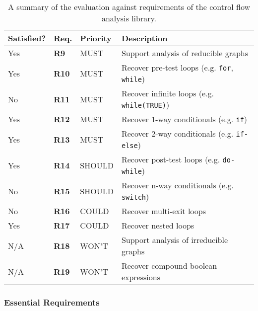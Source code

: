 \begin{table}[htbp]
	\begin{center}
		\begin{tabular}{|l|l|l|l|}
			\hline
			Satisfied? & Req. & Priority & Description \\
			\hline
			\rowcolor{light_green_3}
			Yes & \textbf{R9} & MUST & Support analysis of reducible graphs \\
			\rowcolor{light_green_3}
			Yes & \textbf{R10} & MUST & Recover pre-test loops (e.g. \texttt{for}, \texttt{while}) \\
			\rowcolor{light_red_3}
			No & \textbf{R11} & MUST & Recover infinite loops (e.g. \texttt{while(TRUE)}) \\
			\rowcolor{light_green_3}
			Yes & \textbf{R12} & MUST & Recover 1-way conditionals (e.g. \texttt{if}) \\
			\rowcolor{light_green_3}
			Yes & \textbf{R13} & MUST & Recover 2-way conditionals (e.g. \texttt{if-else}) \\
			\hline
			\rowcolor{light_green_3}
			Yes & \textbf{R14} & SHOULD & Recover post-test loops (e.g. \texttt{do-while}) \\
			\rowcolor{light_red_3}
			No & \textbf{R15} & SHOULD & Recover n-way conditionals (e.g. \texttt{switch}) \\
			\hline
			\rowcolor{light_red_3}
			No & \textbf{R16} & COULD & Recover multi-exit loops \\
			\rowcolor{light_green_3}
			Yes & \textbf{R17} & COULD & Recover nested loops \\
			\hline
			N/A & \textbf{R18} & WON'T & Support analysis of irreducible graphs \\
			N/A & \textbf{R19} & WON'T & Recover compound boolean expressions \\
			\hline
		\end{tabular}
	\end{center}
	\caption{A summary of the evaluation against requirements of the control flow analysis library.}
	\label{tbl:eval_summary_of_control_flow_analysis_library}
\end{table}


\subsubsection{Essential Requirements}
\label{sec:eval_control_flow_analysis_library_essential_requirements}

